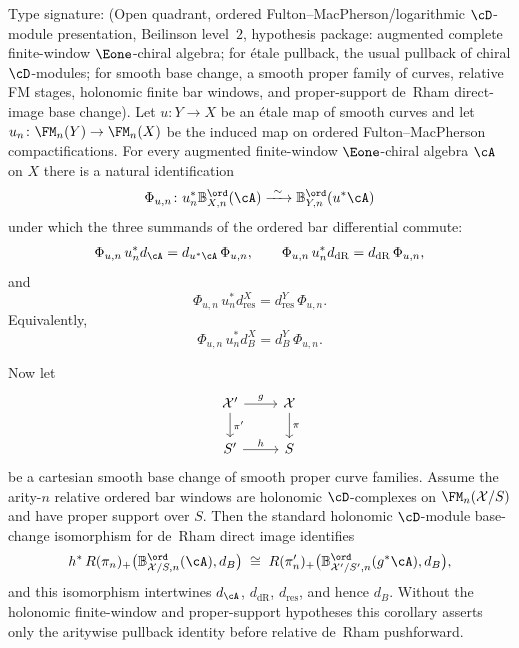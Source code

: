 \begin{corollary}
\label{cor:ordered-bar-differential-base-change}
Type signature: \textup{(}Open quadrant, ordered
Fulton--MacPherson/logarithmic \(\cD\)-module presentation,
Beilinson level~$2$, hypothesis package: augmented complete
finite-window \(\Eone\)-chiral algebra; for \'{e}tale pullback, the
usual pullback of chiral \(\cD\)-modules; for smooth base change, a
smooth proper family of curves, relative FM stages, holonomic finite
bar windows, and proper-support de~Rham direct-image base
change\textup{)}.
Let \(u\colon Y\to X\) be an \'{e}tale map of smooth curves and let
\(u_n\colon\FM_n(Y)\to\FM_n(X)\) be the induced map on ordered
Fulton--MacPherson compactifications. For every augmented finite-window
\(\Eone\)-chiral algebra \(\cA\) on \(X\) there is a natural
identification
\[
\Phi_{u,n}\colon
u_n^*\mathbb B^{\ord}_{X,n}(\cA)
\xrightarrow{\ \sim\ }
\mathbb B^{\ord}_{Y,n}(u^*\cA)
\]
under which the three summands of the ordered bar differential commute:
\[
\Phi_{u,n}\,u_n^*d_\cA=d_{u^*\cA}\,\Phi_{u,n},\qquad
\Phi_{u,n}\,u_n^*d_{\mathrm{dR}}
=d_{\mathrm{dR}}\,\Phi_{u,n},
\]
and
\[
\Phi_{u,n}\,u_n^*d_{\mathrm{res}}^X
=d_{\mathrm{res}}^Y\,\Phi_{u,n}.
\]
Equivalently,
\[
\Phi_{u,n}\,u_n^*d_B^X=d_B^Y\,\Phi_{u,n}.
\]

Now let
\[
\begin{tikzcd}
\mathcal X' \arrow[r,"g"] \arrow[d,"\pi'"] &
\mathcal X \arrow[d,"\pi"]\\
S' \arrow[r,"h"] & S
\end{tikzcd}
\]
be a cartesian smooth base change of smooth proper curve families.
Assume the arity-\(n\) relative ordered bar windows are holonomic
\(\cD\)-complexes on \(\FM_n(\mathcal X/S)\) and have proper support
over \(S\). Then the standard holonomic \(\cD\)-module base-change
isomorphism for de~Rham direct image identifies
\[
h^*\,R(\pi_n)_+
\bigl(\mathbb B^{\ord}_{\mathcal X/S,n}(\cA),d_B\bigr)
\;\cong\;
R(\pi'_n)_+
\bigl(\mathbb B^{\ord}_{\mathcal X'/S',n}(g^*\cA),d_B\bigr),
\]
and this isomorphism intertwines \(d_\cA\), \(d_{\mathrm{dR}}\),
\(d_{\mathrm{res}}\), and hence \(d_B\). Without the holonomic
finite-window and proper-support hypotheses this corollary asserts only
the aritywise pullback identity before relative de~Rham pushforward.
\end{corollary}

